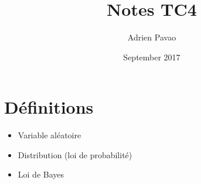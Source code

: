 \documentclass{article}
\title{Notes TC4}
\author{Adrien Pavao}
\date{September 2017}
\begin{document}
\maketitle

\section{Définitions}

\begin{itemize}
\item Variable aléatoire
\item Distribution (loi de probabilité)
\item Loi de Bayes
\end{itemize}
\end{document}
